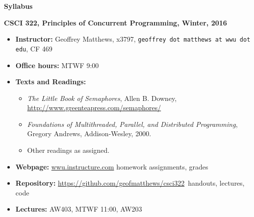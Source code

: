 \documentclass{article}
\begin{document}
\centerline{\large \bf Syllabus}

\centerline{\bf CSCI 322, Principles of Concurrent Programming, Winter, 2016}

\begin{itemize}

\item
{\bf Instructor:} Geoffrey Matthews, x3797, {\tt  geoffrey dot matthews at wwu dot edu}, CF 469
\item
{\bf Office hours:} MTWF 9:00
\item
{\bf Texts and Readings:} 
\begin{itemize}
\item {\em The Little Book of Semaphores}, Allen B. Downey, 
\url{http://www.greenteapress.com/semaphores/}
\item {\em Foundations of Multithreaded, Parallel, and Distributed Programming}, Gregory Andrews, Addison-Wesley, 2000.
\item Other readings as assigned.
\end{itemize}
\item {\bf Webpage:}  \url{wwu.instructure.com}  homework assignments, grades
\item {\bf Repository:} \url{https://github.com/geofmatthews/csci322}\  handouts, lectures, code
\item
{\bf Lectures:} 
 AW403, MTWF 11:00, AW203


\end{itemize}
\end{document}

